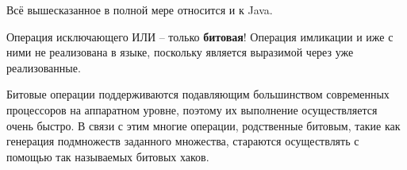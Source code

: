 \begin{remark}
	Всё вышесказанное в полной мере относится и к Java.
\end{remark}

\begin{remark}
	Операция исключающего ИЛИ -- только \textbf{битовая}! Операция имликации и иже с ними не реализована в языке, поскольку является выразимой через уже реализованные.
\end{remark}

\begin{remark} \label{cpu-bit}
	Битовые операции поддерживаются подавляющим большинством современных процессоров на аппаратном уровне, поэтому их выполнение осуществляется очень быстро. В связи с этим многие операции, родственные битовым, такие как генерация подмножеств заданного множества, стараются осуществлять с помощью так называемых битовых хаков.
\end{remark}
